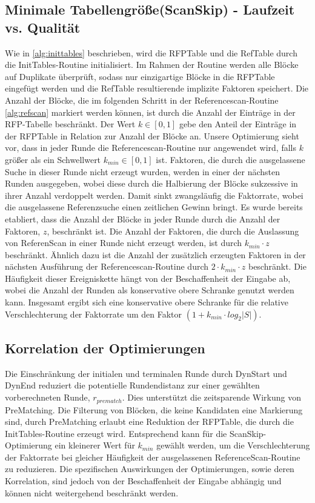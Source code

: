 \subsection{Minimale Tabellengröße(ScanSkip) - Laufzeit vs. Qualität}
Wie in \ref{alg:inittables} beschrieben, wird die RFPTable und die RefTable durch die InitTables-Routine initialisiert. Im Rahmen der Routine werden alle Blöcke auf Duplikate
überprüft, sodass nur einzigartige Blöcke in die RFPTable eingefügt werden und die RefTable resultierende implizite Faktoren speichert. Die Anzahl der Blöcke, die im folgenden Schritt 
in der Referencescan-Routine \ref{alg:refscan} markiert werden können, ist durch die Anzahl der Einträge in der RFP-Tabelle beschränkt. Der Wert $k\in [0,1]$ gebe den Anteil der
Einträge in der RFPTable in Relation zur Anzahl der Blöcke an. Unsere Optimierung sieht vor, dass in jeder Runde die Referencescan-Routine nur angewendet wird, falls $k$ größer
als ein Schwellwert $k_{min}\in [0,1]$ ist. Faktoren, die durch die ausgelassene Suche in dieser Runde nicht erzeugt wurden, werden in einer der nächsten Runden ausgegeben, wobei diese
durch die Halbierung der Blöcke sukzessive in ihrer Anzahl verdoppelt werden. Damit sinkt zwangsläufig die Faktorrate, wobei die ausgelassene Referenzsuche einen zeitlichen Gewinn bringt.
Es wurde bereits etabliert, dass die Anzahl der Blöcke in jeder Runde durch die Anzahl der Faktoren, $z$, beschränkt ist. Die Anzahl der Faktoren, die durch die Auslassung von 
ReferenScan in einer Runde nicht erzeugt werden, ist durch $k_{min} \cdot z$ beschränkt. Ähnlich dazu ist die Anzahl der zusätzlich erzeugten Faktoren in der nächsten Ausführung
der Referencescan-Routine durch $2 \cdot k_{min} \cdot z$ beschränkt. Die Häufigkeit dieser Ereigniskette hängt von der Beschaffenheit der Eingabe ab, wobei die Anzahl der
Runden als konservative obere Schranke genutzt werden kann. Insgesamt ergibt sich eine konservative obere Schranke für die relative Verschlechterung der Faktorrate um den Faktor 
$(1 + k_{min} \cdot {log_2{|S|}})$.

\subsection{Korrelation der Optimierungen}
Die Einschränkung der initialen und terminalen Runde durch DynStart und DynEnd reduziert die potentielle Rundendistanz zur einer gewählten vorberechneten Runde, $r_{prematch}$.
Dies unterstützt die zeitsparende Wirkung von PreMatching. Die Filterung von Blöcken, die keine Kandidaten eine Markierung sind, durch PreMatching erlaubt eine Reduktion der 
RFPTable, die durch die InitTables-Routine erzeugt wird. Entsprechend kann für die ScanSkip-Optimierung ein kleinerer Wert für $k_{min}$ gewählt werden, um die Verschlechterung
der Faktorrate bei gleicher Häufigkeit der ausgelassenen ReferenceScan-Routine zu reduzieren. Die spezifischen Auswirkungen der Optimierungen, sowie deren Korrelation, sind 
jedoch von der Beschaffenheit der Eingabe abhängig und können nicht weitergehend beschränkt werden.
